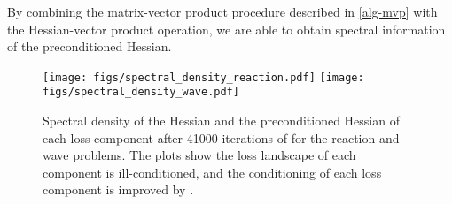By combining the matrix-vector product procedure described in \cref{alg-mvp} with the Hessian-vector product operation, we are able to obtain spectral information of the preconditioned Hessian. 

\begin{figure*}
    \centering
    \texttt{[image: figs/spectral\_density\_reaction.pdf]}
    \texttt{[image: figs/spectral\_density\_wave.pdf]}
    \caption{Spectral density of the Hessian and the preconditioned Hessian of each loss component after 41000 iterations of \al{} for the reaction and wave problems. The plots show the loss landscape of each component is ill-conditioned, and the conditioning of each loss component is improved by \lbfgs{}.}
    \label{fig:spectral_density_reaction_wave}
\end{figure*}